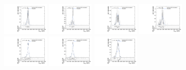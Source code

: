 \begin{figure}[htpb]
  \centering
  \includegraphics[width=0.2\textwidth]{fig/2Dfit/templateVsReco_VBFGbuToWW2000_r0_MVV_mu_HP_bb_LDy_linear.pdf}
  \includegraphics[width=0.2\textwidth]{fig/2Dfit/templateVsReco_VBFGbuToWW2000_r0_MVV_mu_LP_bb_LDy_linear.pdf}
  \includegraphics[width=0.2\textwidth]{fig/2Dfit/templateVsReco_VBFGbuToWW2000_r0_MVV_mu_HP_bb_HDy_linear.pdf}
  \includegraphics[width=0.2\textwidth]{fig/2Dfit/templateVsReco_VBFGbuToWW2000_r0_MVV_mu_LP_bb_HDy_linear.pdf}\\
  \includegraphics[width=0.2\textwidth]{fig/2Dfit/templateVsReco_VBFGbuToWW2000_r0_MVV_mu_HP_nobb_LDy_linear.pdf}
  \includegraphics[width=0.2\textwidth]{fig/2Dfit/templateVsReco_VBFGbuToWW2000_r0_MVV_mu_LP_nobb_LDy_linear.pdf}
  \includegraphics[width=0.2\textwidth]{fig/2Dfit/templateVsReco_VBFGbuToWW2000_r0_MVV_mu_HP_nobb_HDy_linear.pdf}

\end{figure}
